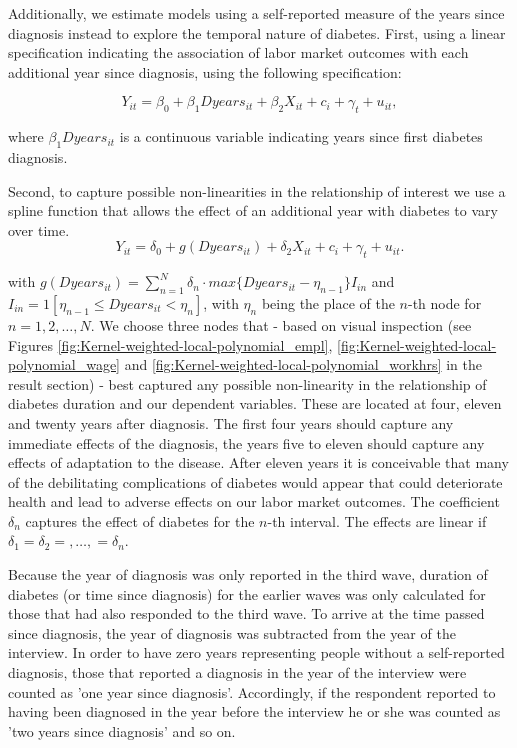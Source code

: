 \documentclass[12pt,english,british]{article}
\begin{document}
Additionally, we estimate models using a self-reported
measure of the years since diagnosis instead to explore the temporal nature of diabetes. First, using a linear specification
indicating the association of labor market outcomes with each additional
year since diagnosis, using the following specification:

\begin{equation}
Y_{it}=\beta_{0}+\beta_{1}Dyears_{it}+\beta_{2}X_{it}+c_{i}+\gamma_{t}+u_{it},\label{eq:duration_linear}
\end{equation}


\noindent where $\beta_{1}Dyears_{it}$ is a continuous variable indicating
years since first diabetes diagnosis.

Second, to capture possible non-linearities in the relationship of interest we use a spline function that allows the effect
of an additional year with diabetes to vary over time.
\begin{equation}
Y_{it}=\delta_{0}+g(Dyears_{it})+\delta_{2}X_{it}+c_{i}+\gamma_{t}+u_{it}.\label{eq:splines}
\end{equation}


\noindent with $g(Dyears_{it})=\sum_{n=1}^{N}\delta_{n}\cdot max\{Dyears_{it}-\eta_{n-1}\}I_{in}$
and $I_{in}=1[\eta_{n-1}\leq Dyears_{it}<\eta_{n}]$, with $\eta_{n}$
being the place of the $n$-th node for $n=1,2,\ldots,N$. We choose
three nodes that - based on visual inspection (see Figures \ref{fig:Kernel-weighted-local-polynomial_empl}, \ref{fig:Kernel-weighted-local-polynomial_wage} and \ref{fig:Kernel-weighted-local-polynomial_workhrs} in the
result section) - best captured any possible non-linearity in the
relationship of diabetes duration and our dependent variables. These
are located at four, eleven and twenty years after diagnosis. The
first four years should capture any immediate effects of the diagnosis,
the years five to eleven should capture any effects of adaptation to
the disease. After eleven years it is conceivable that many of the
debilitating complications of diabetes would appear that could deteriorate
health and lead to adverse effects on our labor market outcomes.
The coefficient$\delta_{n}$ captures the effect of diabetes for the
$n$-th interval. The effects are linear if $\delta_{1}=\delta_{2}=,\ldots,=\delta_{n}$.

Because the year of diagnosis was only reported in the third wave,
duration of diabetes (or time since diagnosis)
for the earlier waves was only calculated for those that had also responded to the third
wave. To arrive at the time passed since diagnosis, the year of diagnosis
was subtracted from the year of the interview. In order to have zero years representing people without a self-reported  diagnosis, those that reported
a diagnosis in the year of the interview were counted as 'one year
since diagnosis'. Accordingly, if the respondent reported to having
been diagnosed in the year before the interview he or she was counted
as 'two years since diagnosis' and so on.
\end{document}
